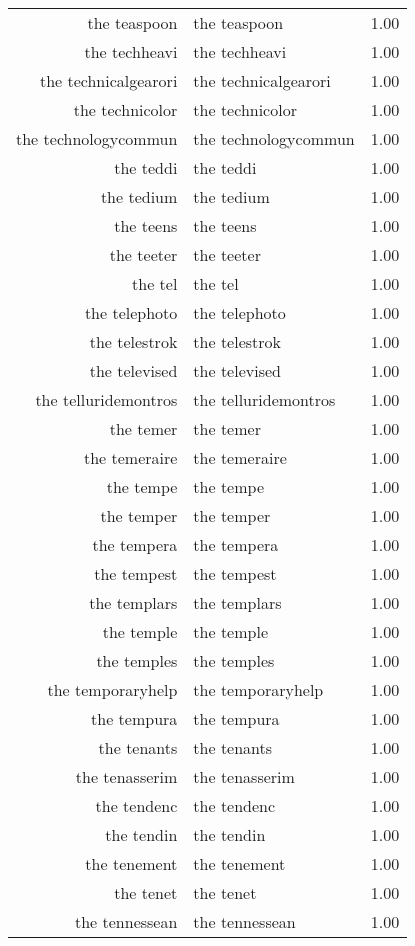\begin{table}[ht]
\begin{tabular}{rlr}
  the teaspoon & the teaspoon & 1.00 \\ 
  the techheavi & the techheavi & 1.00 \\ 
  the technicalgearori & the technicalgearori & 1.00 \\ 
  the technicolor & the technicolor & 1.00 \\ 
  the technologycommun & the technologycommun & 1.00 \\ 
  the teddi & the teddi & 1.00 \\ 
  the tedium & the tedium & 1.00 \\ 
  the teens & the teens & 1.00 \\ 
  the teeter & the teeter & 1.00 \\ 
  the tel & the tel & 1.00 \\ 
  the telephoto & the telephoto & 1.00 \\ 
  the telestrok & the telestrok & 1.00 \\ 
  the televised & the televised & 1.00 \\ 
  the telluridemontros & the telluridemontros & 1.00 \\ 
  the temer & the temer & 1.00 \\ 
  the temeraire & the temeraire & 1.00 \\ 
  the tempe & the tempe & 1.00 \\ 
  the temper & the temper & 1.00 \\ 
  the tempera & the tempera & 1.00 \\ 
  the tempest & the tempest & 1.00 \\ 
  the templars & the templars & 1.00 \\ 
  the temple & the temple & 1.00 \\ 
  the temples & the temples & 1.00 \\ 
  the temporaryhelp & the temporaryhelp & 1.00 \\ 
  the tempura & the tempura & 1.00 \\ 
  the tenants & the tenants & 1.00 \\ 
  the tenasserim & the tenasserim & 1.00 \\ 
  the tendenc & the tendenc & 1.00 \\ 
  the tendin & the tendin & 1.00 \\ 
  the tenement & the tenement & 1.00 \\ 
  the tenet & the tenet & 1.00 \\ 
  the tennessean & the tennessean & 1.00 \\ 

\end{tabular}
\end{table}
